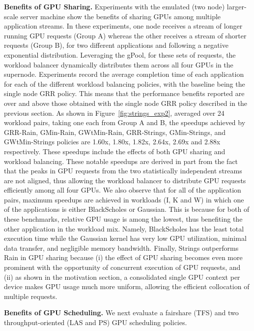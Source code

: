 \textbf{Benefits of GPU Sharing.} Experiments with the emulated (two node) larger-scale server machine show the benefits of sharing GPUs among multiple application streams. In these experiments, one node receives a stream of longer running GPU requests (Group A) whereas the other receives a stream of shorter requests (Group B), for two different applications and following a negative exponential distribution. Leveraging the gPool, for these sets of requests, the workload balancer dynamically distributes them across all four GPUs in the supernode. Experiments record the average completion time of each application for each of the different workload balancing policies, with the baseline being the single node GRR policy. This means that the performance benefits reported are over and above those obtained with the single node GRR policy described in the previous section. As shown in Figure~\ref{fig:strings_exp2}, averaged over 24 workload pairs, taking one each from Group A and B, the speedups achieved by GRR-Rain, GMin-Rain, GWtMin-Rain, GRR-Strings, GMin-Strings, and GWtMin-Strings policies are 1.60x, 1.80x, 1.82x, 2.64x, 2.69x and 2.88x respectively. These speedups include the effects of both GPU sharing and workload balancing. These notable speedups are derived in part from the fact that the peaks in GPU requests from the two statistically independent streams are not aligned, thus allowing the workload balancer to distribute GPU requests efficiently among all four GPUs. We also observe that for all of the application pairs, maximum speedups are achieved in workloads (I, K and W) in which one of the applications is either BlackScholes or Gaussian. This is because for both of these benchmarks, relative GPU usage is among the lowest,  thus benefiting the other application in the workload mix. Namely, BlackScholes has the least total execution time while the Gaussian kernel has very low GPU utilization, minimal data transfer, and negligible memory bandwidth. Finally, Strings outperforms Rain in GPU sharing because (i) the effect of GPU sharing becomes even more prominent with the opportunity of concurrent execution of GPU requests, and (ii) as shown in the motivation section, a consolidated single GPU context per device makes GPU usage much more uniform, allowing the efficient collocation of multiple requests.

\textbf{Benefits of GPU Scheduling. }We next evaluate a fairshare (TFS) and two throughput-oriented (LAS and PS) GPU scheduling policies.

